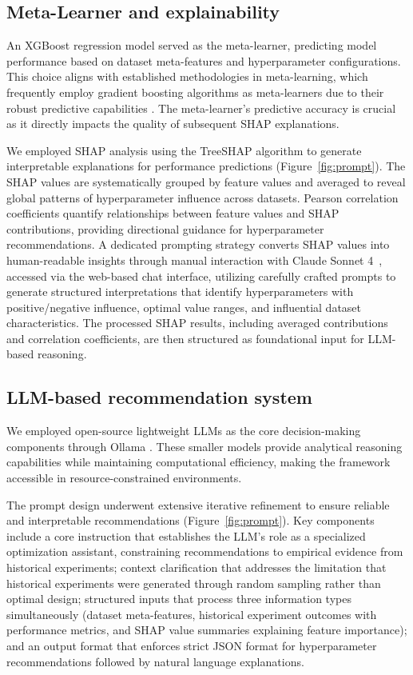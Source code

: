 \documentclass{article}
\begin{document}
\subsection{Meta-Learner and explainability}

An XGBoost regression model served as the meta-learner, predicting model performance based on dataset meta-features and hyperparameter configurations. This choice aligns with established methodologies in meta-learning, which frequently employ gradient boosting algorithms as meta-learners due to their robust predictive capabilities \cite{woznica2021towards}. The meta-learner's predictive accuracy is crucial as it directly impacts the quality of subsequent SHAP explanations.


We employed SHAP analysis using the TreeSHAP \cite{lundberg2020local} algorithm to generate interpretable explanations for performance predictions (Figure~\ref{fig:prompt}). The SHAP values are systematically grouped by feature values and averaged to reveal global patterns of hyperparameter influence across datasets. Pearson correlation coefficients quantify relationships between feature values and SHAP contributions, providing directional guidance for hyperparameter recommendations.
%
A dedicated prompting strategy converts SHAP values into human-readable insights through manual interaction with Claude Sonnet 4~\cite{anthropic2025claude}, accessed via the web-based chat interface, utilizing carefully crafted prompts to generate structured interpretations that identify hyperparameters with positive/negative influence, optimal value ranges, and influential dataset characteristics. The processed SHAP results, including averaged contributions and correlation coefficients, are then structured as foundational input for LLM-based reasoning.


\subsection{LLM-based recommendation system}

We employed open-source lightweight LLMs as the core decision-making components through Ollama \cite{ollama}. These smaller models provide analytical reasoning capabilities while maintaining computational efficiency, making the framework accessible in resource-constrained environments.

The prompt design underwent extensive iterative refinement to ensure reliable and interpretable recommendations (Figure~\ref{fig:prompt}). Key components include a core instruction that establishes the LLM's role as a specialized optimization assistant, constraining recommendations to empirical evidence from historical experiments; context clarification that addresses the limitation that historical experiments were generated through random sampling rather than optimal design; structured inputs that process three information types simultaneously (dataset meta-features, historical experiment outcomes with performance metrics, and SHAP value summaries explaining feature importance); and an output format that enforces strict JSON format for hyperparameter recommendations followed by natural language explanations.
\end{document}
